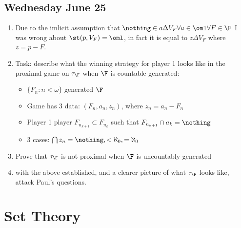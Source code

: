 \documentclass{article}
\begin{document}
\subsection*{Wednesday June 25}
\begin{enumerate}
    \item Due to the imlicit assumption that \(\nothing \in a\Delta V_F \forall a\in\oml\forall F \in \F\) I was wrong about \(\st(p, V_F) = \oml\), in fact it is equal to \(z\Delta V_F\) where \(z = p - F\). 
    \item Task: describe what the winning strategy for player 1 looks like in the proximal game on \(\tau_{\F}\) when \(\F\) is  countable generated:
    \begin{itemize}
        \item \(\{F_n: n < \omega\}\) generated \(\F\)
        \item Game has 3 data: \((F_n, a_n, z_n)\), where \(z_n = a_n - F_n\)
        \item Player 1 player \(F_{n_{k+1}} \subset F_{n_k}\) such that \(F_{n_{k+1}}\cap a_k = \nothing\)
        \item 3 cases: \(\bigcap z_n = \nothing, < \aleph_0, = \aleph_0\)
    \end{itemize}
    \item Prove that \(\tau_{\F}\) is not proximal when \(\F\) is uncountably generated
    \item with the above established, and a clearer picture of what \(\tau_{\F}\) looks like, attack Paul's questions.
    
\end{enumerate}
\section{Set Theory}
\end{document}

